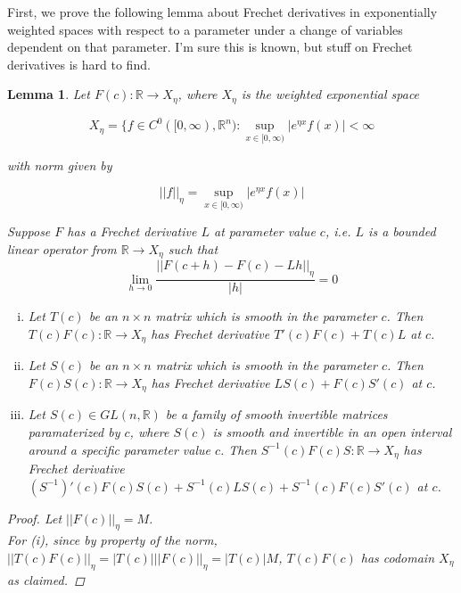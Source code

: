 \documentclass[12pt]{article}
\def\R{{\mathbb R}}
\newtheorem{lemma}{Lemma}
\begin{document}
First, we prove the following lemma about Frechet derivatives in exponentially weighted spaces with respect to a parameter under a change of variables dependent on that parameter. I'm sure this is known, but stuff on Frechet derivatives is hard to find.\\

\begin{lemma}\label{frechetfun}
Let $F(c): \R \rightarrow X_\eta$, where $X_\eta$ is the weighted exponential space

\[
X_\eta = \{ f \in C^0([0, \infty), \R^n) : \sup_{x \in [0, \infty)} |e^{\eta x} f(x)| < \infty 
\]

with norm given by

\[
||f||_\eta = \sup_{x \in [0, \infty)} |e^{\eta x} f(x)|
\]

Suppose $F$ has a Frechet derivative $L$ at parameter value $c$, i.e. $L$ is a bounded linear operator from $\R \rightarrow X_\eta$ such that 
\[
\lim_{h \rightarrow 0} \frac{|| F(c+h) - F(c) - Lh ||_\eta }{|h|} = 0
\]

\begin{enumerate}[(i)]

\item Let $T(c)$ be an $n \times n$ matrix which is smooth in the parameter $c$. Then $T(c)F(c): \R \rightarrow X_\eta$ has Frechet derivative $T'(c)F(c) + T(c)L$ at $c$.

\item Let $S(c)$ be an $n \times n$ matrix which is smooth in the parameter $c$. Then $F(c)S(c): \R \rightarrow X_\eta$ has Frechet derivative $L S(c) + F(c)S'(c)$ at $c$.

\item Let $S(c) \in GL(n, \R)$ be a family of smooth invertible matrices paramaterized by $c$, where $S(c)$ is smooth and invertible in an open interval around a specific parameter value $c$. Then $S^{-1}(c)F(c)S: \R \rightarrow X_\eta$ has Frechet derivative $(S^{-1})'(c) F(c) S(c) + S^{-1}(c) L S (c) + S^{-1}(c) F(c) S'(c)$ at $c$.

\end{enumerate}

\begin{proof}

Let $||F(c)||_\eta = M$.\\

For (i), since by property of the norm, $||T(c)F(c)||_\eta = |T(c)| ||F(c)||_\eta = |T(c)|M$, $T(c)F(c)$ has codomain $X_\eta$ as claimed.


\end{proof}
\end{lemma}
\end{document}

